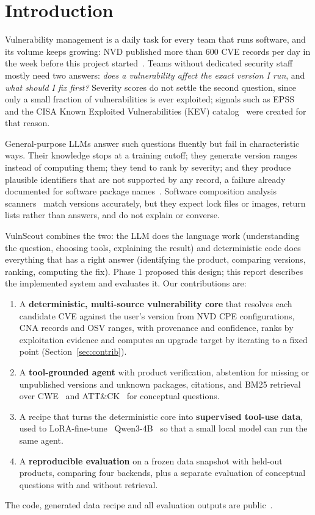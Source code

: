 \documentclass[final]{cvpr}
\begin{document}
\section{Introduction}
\label{sec:intro}

Vulnerability management is a daily task for every team that runs software, and its volume keeps growing: NVD published more than 600 CVE records per day in the week before this project started~\cite{nvd}. Teams without dedicated security staff mostly need two answers: \emph{does a vulnerability affect the exact version I run}, and \emph{what should I fix first?} Severity scores do not settle the second question, since only a small fraction of vulnerabilities is ever exploited; signals such as EPSS~\cite{jacobs2019epss,jacobs2023epss} and the CISA Known Exploited Vulnerabilities (KEV) catalog~\cite{cisakev} were created for that reason.

General-purpose LLMs answer such questions fluently but fail in characteristic ways. Their knowledge stops at a training cutoff; they generate version ranges instead of computing them; they tend to rank by severity; and they produce plausible identifiers that are not supported by any record, a failure already documented for software package names~\cite{spracklen2025package}. Software composition analysis scanners~\cite{trivy,grype,osvscanner,dependabot} match versions accurately, but they expect lock files or images, return lists rather than answers, and do not explain or converse.

VulnScout combines the two: the LLM does the language work (understanding the question, choosing tools, explaining the result) and deterministic code does everything that has a right answer (identifying the product, comparing versions, ranking, computing the fix). Phase 1 proposed this design; this report describes the implemented system and evaluates it. Our contributions are:
\begin{enumerate}
  \item A \textbf{deterministic, multi-source vulnerability core} that resolves each candidate CVE against the user's version from NVD CPE configurations, CNA records and OSV ranges, with provenance and confidence, ranks by exploitation evidence and computes an upgrade target by iterating to a fixed point (Section~\ref{sec:contrib}).
  \item A \textbf{tool-grounded agent} with product verification, abstention for missing or unpublished versions and unknown packages, citations, and BM25 retrieval over CWE~\cite{cwe} and ATT\&CK~\cite{attack} for conceptual questions.
  \item A recipe that turns the deterministic core into \textbf{supervised tool-use data}, used to LoRA-fine-tune~\cite{hu2022lora} Qwen3-4B~\cite{qwen3} so that a small local model can run the same agent.
  \item A \textbf{reproducible evaluation} on a frozen data snapshot with held-out products, comparing four backends, plus a separate evaluation of conceptual questions with and without retrieval.
\end{enumerate}
The code, generated data recipe and all evaluation outputs are public~\cite{vulnscoutrepo}.
\end{document}
